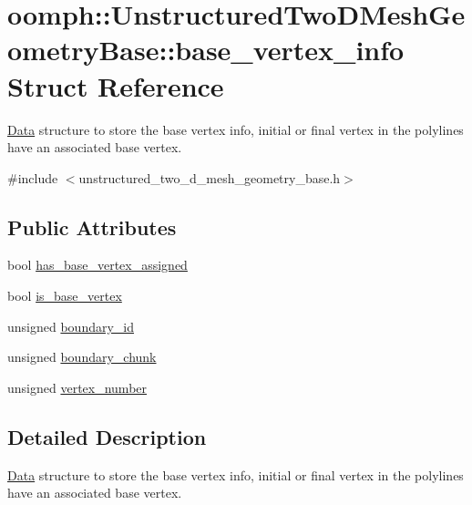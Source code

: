 \hypertarget{structoomph_1_1UnstructuredTwoDMeshGeometryBase_1_1base__vertex__info}{}\section{oomph\+:\+:Unstructured\+Two\+D\+Mesh\+Geometry\+Base\+:\+:base\+\_\+vertex\+\_\+info Struct Reference}
\label{structoomph_1_1UnstructuredTwoDMeshGeometryBase_1_1base__vertex__info}


\hyperlink{classoomph_1_1Data}{Data} structure to store the base vertex info, initial or final vertex in the polylines have an associated base vertex.  




{\ttfamily \#include $<$unstructured\+\_\+two\+\_\+d\+\_\+mesh\+\_\+geometry\+\_\+base.\+h$>$}

\subsection*{Public Attributes}
\begin{DoxyCompactItemize}
\item 
bool \hyperlink{structoomph_1_1UnstructuredTwoDMeshGeometryBase_1_1base__vertex__info_a3448db94f297b6d9d01d23ed3c21228c}{has\+\_\+base\+\_\+vertex\+\_\+assigned}
\item 
bool \hyperlink{structoomph_1_1UnstructuredTwoDMeshGeometryBase_1_1base__vertex__info_a271c3c8a2e0e7e878e7ee7087385833f}{is\+\_\+base\+\_\+vertex}
\item 
unsigned \hyperlink{structoomph_1_1UnstructuredTwoDMeshGeometryBase_1_1base__vertex__info_a873a731fa8ed34d8cbcde0f174068c42}{boundary\+\_\+id}
\item 
unsigned \hyperlink{structoomph_1_1UnstructuredTwoDMeshGeometryBase_1_1base__vertex__info_abf6b6e60919954406c0acfe8fb7b9dd9}{boundary\+\_\+chunk}
\item 
unsigned \hyperlink{structoomph_1_1UnstructuredTwoDMeshGeometryBase_1_1base__vertex__info_a9b61cf78b552a59505103d81ac830bfb}{vertex\+\_\+number}
\end{DoxyCompactItemize}


\subsection{Detailed Description}
\hyperlink{classoomph_1_1Data}{Data} structure to store the base vertex info, initial or final vertex in the polylines have an associated base vertex. 


